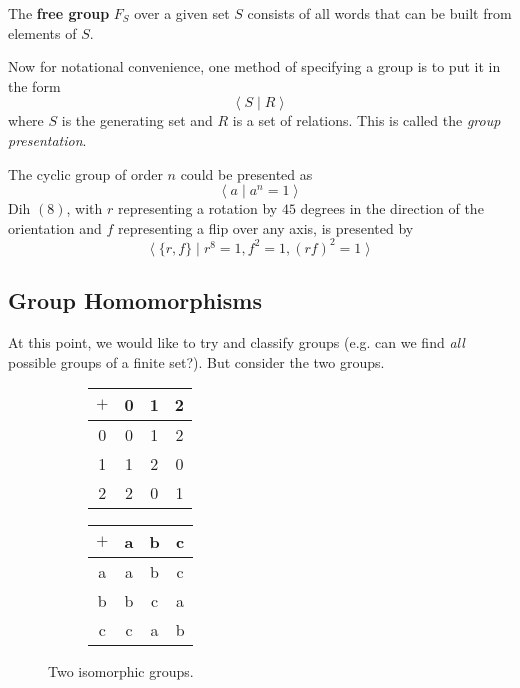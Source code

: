   \begin{definition}
    The \textbf{free group} $F_{S}$ over a given set $S$ consists of all words that can be built from elements of $S$. 
  \end{definition}

  Now for notational convenience, one method of specifying a group is to put it in the form
  \begin{equation}
    \big\langle \; S \; | \; R \;\big\rangle
  \end{equation}
  where $S$ is the generating set and $R$ is a set of relations. This is called the \textit{group presentation}. 

  \begin{example}
    The cyclic group of order $n$ could be presented as
    \begin{equation}
      \big\langle \; a \; | \; a^{n} = 1 \;\big\rangle
    \end{equation}
    Dih $(8)$, with $r$ representing a rotation by $45$ degrees in the direction of the orientation and $f$ representing a flip over any axis, is presented by
    \begin{equation}
      \big\langle \; \{ r, f\} \; | \; r^{8} = 1, f^{2} = 1, (r f)^{2} = 1 \;\big\rangle
    \end{equation}
  \end{example}

\subsection{Group Homomorphisms}

  At this point, we would like to try and classify groups (e.g. can we find \textit{all} possible groups of a finite set?). But consider the two groups. 

  \begin{figure}[H]
    \centering
    \begin{subfigure}[b]{0.48\textwidth}
      \centering
      \begin{tabular}{c|ccc}
        \hline
        $+$ & 0 & 1 & 2 \\
        \hline
        0 & 0 & 1 & 2 \\
        1 & 1 & 2 & 0 \\
        2 & 2 & 0 & 1 \\
        \hline
      \end{tabular}
    \end{subfigure}
    \hfill 
    \begin{subfigure}[b]{0.48\textwidth}
      \centering
      \begin{tabular}{c|ccc}
        \hline
        $+$ & a & b & c \\
        \hline
        a & a & b & c \\
        b & b & c & a \\
        c & c & a & b \\
        \hline
      \end{tabular}
    \end{subfigure}
    \caption{Two isomorphic groups.}
  \end{figure} 

